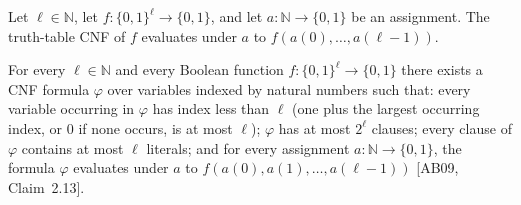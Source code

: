 \begin{theorem}
\label{Complexity.falsifyingCNF_eval}
\leanok
{}
Let $\ell\in\mathbb{N}$, let $f:\{0,1\}^{\ell}\to\{0,1\}$, and let
$a:\mathbb{N}\to\{0,1\}$ be an assignment. The truth-table CNF of $f$ evaluates under
$a$ to $f(a(0),\ldots,a(\ell-1))$.
\end{theorem}

\begin{theorem}
\label{Complexity.exists_cnf_boolFun}
\leanok
{}
For every $\ell \in \mathbb{N}$ and every Boolean function
$f : \{0,1\}^\ell \to \{0,1\}$ there exists a CNF formula $\varphi$ over variables
indexed by natural numbers such that: every variable occurring in $\varphi$ has index
less than $\ell$ (one plus the largest occurring index, or $0$ if none occurs, is at
most $\ell$); $\varphi$ has at most $2^\ell$ clauses; every clause of $\varphi$
contains at most $\ell$ literals; and for every assignment
$a : \mathbb{N} \to \{0,1\}$, the formula $\varphi$ evaluates under $a$ to
$f(a(0), a(1), \dots, a(\ell-1))$ [AB09, Claim~2.13].
\end{theorem}
